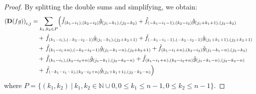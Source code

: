 \begin{proof}




By splitting the double sums and simplifying, we obtain:
\begin{align} \label{eq:split_double_sum}
\left( \mathbf{D}(f g) \right)_{i, j} &= 
\sum_{k_1, k_2 \in P} \left(
\hat{f}_{(k_1-i_1),(k_2-i_2)} \hat{g}_{(j_1-k_1),(j_2-k_2)} +
\hat{f}_{(-k_1-i_1-1),(k_2-i_2)} \hat{g}_{(j_1+k_1+1),(j_2-k_2)} \right. \notag \\ &\quad+ \left.
\hat{f}_{(k_1-i_1),(-k_2-i_2-1)} \hat{g}_{(j_1-k_1),(j_2+k_2+1)} +
\hat{f}_{(-k_1-i_1-1),(-k_2-i_2-1)} \hat{g}_{(j_1+k_1+1),(j_2+k_2+1)} \right. \notag \\ &\quad+ \left.
\hat{f}_{(k_1-i_1+n),(-k_2-i_2-1)} \hat{g}_{(j_1-k_1-n),(j_2+k_2+1)} +
\hat{f}_{(k_1-i_1+n),(k_2-i_2)} \hat{g}_{(j_1-k_1-n),(j_2-k_2)} \right. \notag \\ &\quad+ \left.
\hat{f}_{(k_1-i_1),(k_2-i_2+n)} \hat{g}_{(j_1-k_1),(j_2-k_2-n)} +
\hat{f}_{(k_1-i_1+n),(k_2-i_2+n)} \hat{g}_{(j_1-k_1-n),(j_2-k_2-n)} \right. \notag \\ &\quad+ \left.
\hat{f}_{(-k_1-i_1-1),(k_2-i_2+n)} \hat{g}_{(j_1+k_1+1),(j_2-k_2-n)}  \right)
\end{align}
where $P = \{ (k_1, k_2)\ |\ k_1, k_2 \in \mathbb{N} \cup 0, 0 \leq k_1 \leq n-1,  0 \leq k_2 \leq n-1 \}$.



\end{proof}
